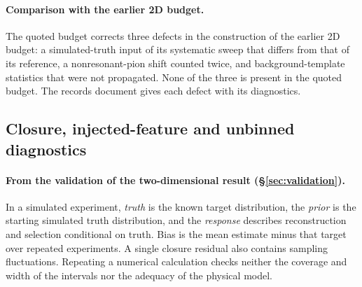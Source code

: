 \paragraph{Comparison with the earlier 2D budget.} The quoted budget corrects three defects in the construction of the earlier 2D budget: a simulated-truth input of its systematic sweep that differs from that of its reference, a nonresonant-pion shift counted twice, and background-template statistics that were not propagated. None of the three is present in the quoted budget. The records document gives each defect with its diagnostics.

\subsection{Closure, injected-feature and unbinned diagnostics}\label{recsec:twod-validation}

\paragraph{From the validation of the two-dimensional result (\S\ref{sec:validation}).} In a simulated experiment, \emph{truth} is the known target distribution, the \emph{prior} is the starting simulated truth distribution, and the \emph{response} describes reconstruction and selection conditional on truth. Bias is the mean estimate minus that target over repeated experiments. A single closure residual also contains sampling fluctuations. Repeating a numerical calculation checks neither the coverage and width of the intervals nor the adequacy of the physical model.

